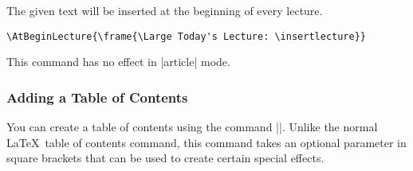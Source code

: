 \begin{command}{\AtBeginLecture{}}
  The given text will be inserted at the beginning of every
  lecture.
  
  \example
\begin{verbatim}
\AtBeginLecture{\frame{\Large Today's Lecture: \insertlecture}}
\end{verbatim}

  \articlenote
  This command has no effect in |article| mode.
\end{command}


\subsubsection{Adding a Table of Contents}

You can create a table of contents using the command
|\tableofcontents|. Unlike the normal \LaTeX\ table of contents
command, this command takes an optional parameter in square brackets
that can be used to create certain special effects.

